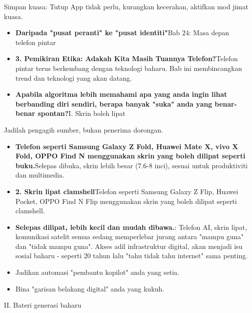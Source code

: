
Simpan kuasa: Tutup App tidak perlu, kurangkan kecerahan, aktifkan mod jimat kuasa.

\begin{itemize}
  \item \textbf{Daripada "pusat peranti" ke "pusat identiti"}Bab 24: Masa depan telefon pintar
  \item \textbf{3. Pemikiran Etika: Adakah Kita Masih Tuannya Telefon?}Telefon pintar terus berkembang dengan teknologi baharu. Bab ini membincangkan trend dan teknologi yang akan datang.
  \item \textbf{Apabila algoritma lebih memahami apa yang anda ingin lihat berbanding diri sendiri, berapa banyak "suka" anda yang benar-benar spontan?}I. Skrin boleh lipat
\end{itemize}


Jadilah pengagih sumber, bukan penerima dorongan.

\begin{itemize}
  \item \textbf{Telefon seperti Samsung Galaxy Z Fold, Huawei Mate X, vivo X Fold, OPPO Find N menggunakan skrin yang boleh dilipat seperti buku.}Selepas dibuka, skrin lebih besar (7.6-8 inci), sesuai untuk produktiviti dan multimedia.
  \item \textbf{2. Skrin lipat clamshell}Telefon seperti Samsung Galaxy Z Flip, Huawei Pocket, OPPO Find N Flip menggunakan skrin yang boleh dilipat seperti clamshell.
  \item \textbf{Selepas dilipat, lebih kecil dan mudah dibawa.}: Telefon AI, skrin lipat, komunikasi satelit semua sedang memperlebar jurang antara "mampu guna" dan "tidak mampu guna". Akses adil infrastruktur digital, akan menjadi isu sosial baharu - seperti 20 tahun lalu "tahu tidak tahu internet" sama penting.
  \item Jadikan automasi "pembantu kopilot" anda yang setia.
  \item Bina "garisan belakang digital" anda yang kukuh.
\end{itemize}


II. Bateri generasi baharu

